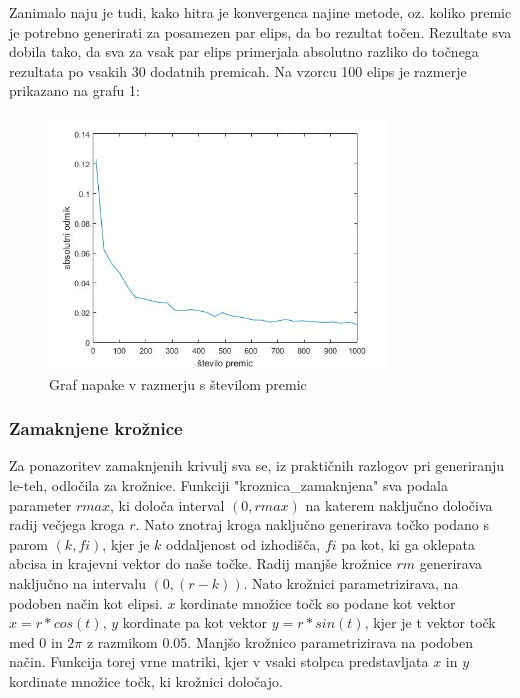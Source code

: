 \documentclass[a4paper]{article}
\begin{document}
Zanimalo naju je tudi, kako hitra je konvergenca najine metode, oz. koliko premic je potrebno generirati za posamezen par elips, da bo rezultat točen. Rezultate sva dobila tako, da sva za vsak par elips primerjala absolutno razliko do točnega rezultata po vsakih 30 dodatnih premicah. Na vzorcu 100 elips je razmerje prikazano na grafu 1: 

\begin{figure}[h]
\centering
\includegraphics[width=90mm]{graf_elipsa2.jpg}
\caption{Graf napake v razmerju s številom premic \label{overflow}}
\end{figure} 

\subsubsection{Zamaknjene krožnice}

Za ponazoritev zamaknjenih krivulj sva se, iz praktičnih razlogov pri generiranju le-teh, odločila za krožnice. Funkciji "kroznica\_zamaknjena" sva podala parameter $rmax$, ki določa interval $(0,rmax)$ na katerem naključno določiva radij večjega kroga $r$. Nato znotraj kroga naključno generirava točko podano s parom $(k,fi)$, kjer je $k$ oddaljenost od izhodišča, $fi$ pa kot, ki ga oklepata abcisa in krajevni vektor do naše točke. Radij manjše krožnice $rm$ generirava naključno na intervalu $(0,(r-k))$. Nato krožnici parametrizirava, na podoben način kot elipsi. $x$ kordinate množice točk so podane kot vektor $x = r*cos(t)$, $y$ kordinate pa kot vektor $y = r*sin(t)$, kjer je t vektor točk med 0 in $2\pi$ z razmikom 0.05. Manjšo krožnico parametrizirava na podoben način.  Funkcija torej vrne matriki, kjer v vsaki stolpca predstavljata $x$ in $y$ kordinate množice točk, ki krožnici določajo. 
\end{document}
